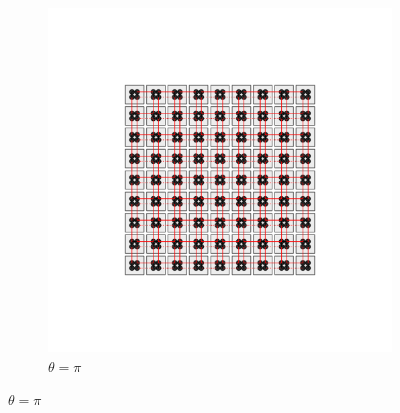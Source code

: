 \begin{figure}[thb!]
\begin{minipage}[h!]{0.9\textwidth}
\begin{subfigure}[b!]{0.2 \textwidth}
         \end{subfigure}\hspace*{-0.5em}
         \begin{subfigure}[b!]{0.2 \textwidth}
             \caption*{$\theta = \pi$}
             \includegraphics[width=\textwidth]{Imagenes/Models/Model_pump/square_pump_model_xy_16.pdf}
         \end{subfigure}\hspace*{-0.5em}
     \end{minipage}\vspace*{-1em}
     

\end{figure}
